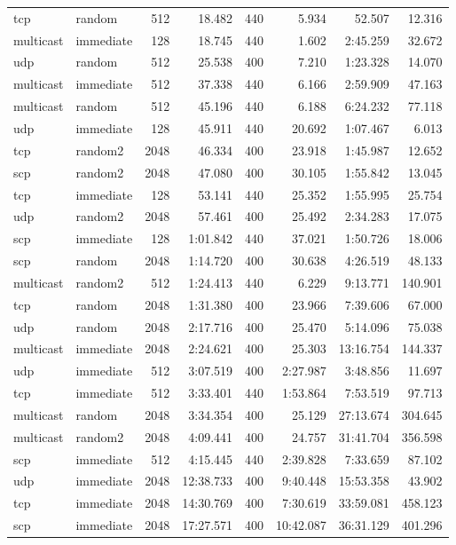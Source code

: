 \begin{tabular}{|l|l|r|r|r|r|r|r|}
tcp & random & 512 & 18.482 & 440 & 5.934 & 52.507 & 12.316\\
multicast & immediate & 128 & 18.745 & 440 & 1.602 & 2:45.259 & 32.672\\
udp & random & 512 & 25.538 & 400 & 7.210 & 1:23.328 & 14.070\\
multicast & immediate & 512 & 37.338 & 440 & 6.166 & 2:59.909 & 47.163\\
multicast & random & 512 & 45.196 & 440 & 6.188 & 6:24.232 & 77.118\\
udp & immediate & 128 & 45.911 & 440 & 20.692 & 1:07.467 & 6.013\\
tcp & random2 & 2048 & 46.334 & 400 & 23.918 & 1:45.987 & 12.652\\
scp & random2 & 2048 & 47.080 & 400 & 30.105 & 1:55.842 & 13.045\\
tcp & immediate & 128 & 53.141 & 440 & 25.352 & 1:55.995 & 25.754\\
udp & random2 & 2048 & 57.461 & 400 & 25.492 & 2:34.283 & 17.075\\
scp & immediate & 128 & 1:01.842 & 440 & 37.021 & 1:50.726 & 18.006\\
scp & random & 2048 & 1:14.720 & 400 & 30.638 & 4:26.519 & 48.133\\
multicast & random2 & 512 & 1:24.413 & 440 & 6.229 & 9:13.771 & 140.901\\
tcp & random & 2048 & 1:31.380 & 400 & 23.966 & 7:39.606 & 67.000\\
udp & random & 2048 & 2:17.716 & 400 & 25.470 & 5:14.096 & 75.038\\
multicast & immediate & 2048 & 2:24.621 & 400 & 25.303 & 13:16.754 & 144.337\\
udp & immediate & 512 & 3:07.519 & 400 & 2:27.987 & 3:48.856 & 11.697\\
tcp & immediate & 512 & 3:33.401 & 440 & 1:53.864 & 7:53.519 & 97.713\\
multicast & random & 2048 & 3:34.354 & 400 & 25.129 & 27:13.674 & 304.645\\
multicast & random2 & 2048 & 4:09.441 & 400 & 24.757 & 31:41.704 & 356.598\\
scp & immediate & 512 & 4:15.445 & 440 & 2:39.828 & 7:33.659 & 87.102\\
udp & immediate & 2048 & 12:38.733 & 400 & 9:40.448 & 15:53.358 & 43.902\\
tcp & immediate & 2048 & 14:30.769 & 400 & 7:30.619 & 33:59.081 & 458.123\\
scp & immediate & 2048 & 17:27.571 & 400 & 10:42.087 & 36:31.129 & 401.296\\
\hline
\end{tabular}
